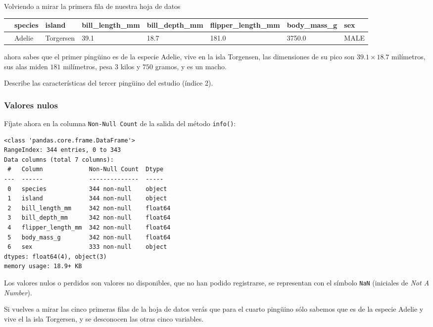 \documentclass[
  a4paper,
  noprof,
  12pt,
  notoc,
  nosols,
  nobib]{mnye}
\renewenvironment{exercise}[1][]{
            \if\relax\detokenize{#1}\relax
                \ex
            \else
                \ex[note={#1}]
            \fi
        }{\endex}
\theoremstyle{definition}
\newtheorem{exercise}{Ejercicio}[section]
\theoremstyle{remark}
\begin{document}
Volviendo a mirar la primera fila de nuestra hoja de datos

\begin{longtable}[]{@{}llllllll@{}}
\toprule\noalign{}
& species & island & bill\_length\_mm & bill\_depth\_mm &
flipper\_length\_mm & body\_mass\_g & sex \\
\midrule\noalign{}
\endhead
\bottomrule\noalign{}
\endlastfoot
0 & Adelie & Torgersen & 39.1 & 18.7 & 181.0 & 3750.0 & MALE \\
\end{longtable}

ahora sabes que el primer pingüino es de la especie Adelie, vive en la
isla Torgensen, las dimensiones de su pico son \(39.1 \times 18.7\)
milímetros, sus alas miden \(181\) milímetros, pesa \(3\) kilos y
\(750\) gramos, y es un macho.

\begin{exercise}[]%
\protect\hypertarget{exr-data}{}\label{exr-data}%
Describe las características del tercer pingüino del estudio (índice 2).

\end{exercise}

\subsubsection{Valores nulos}\label{valores-nulos}

Fíjate ahora en la columna \texttt{Non-Null\ Count} de la salida del
método \texttt{info()}:

\begin{verbatim}
<class 'pandas.core.frame.DataFrame'>
RangeIndex: 344 entries, 0 to 343
Data columns (total 7 columns):
 #   Column             Non-Null Count  Dtype  
---  ------             --------------  -----  
 0   species            344 non-null    object 
 1   island             344 non-null    object 
 2   bill_length_mm     342 non-null    float64
 3   bill_depth_mm      342 non-null    float64
 4   flipper_length_mm  342 non-null    float64
 5   body_mass_g        342 non-null    float64
 6   sex                333 non-null    object 
dtypes: float64(4), object(3)
memory usage: 18.9+ KB
\end{verbatim}

Los valores nulos o perdidos son valores no disponibles, que no han
podido registrarse, se representan con el símbolo \texttt{NaN}
(iniciales de \emph{Not A Number}).

Si vuelves a mirar las cinco primeras filas de la hoja de datos verás
que para el cuarto pingüino sólo sabemos que es de la especie Adelie y
vive el la isla Torgersen, y se desconocen las otras cinco variables.
\end{document}
